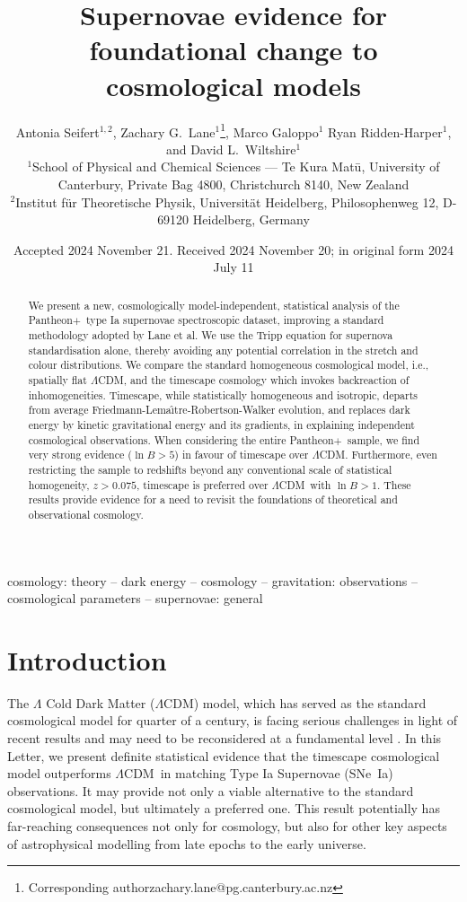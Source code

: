 \documentclass[fleqn,usenatbib]{mnras}
\title[Evidence for fundamental change in cosmology]{Supernovae evidence for foundational change to cosmological models}
\author[Seifert et al.]{\fontsize{13pt}{16pt}\selectfont Antonia Seifert$^{1,2}$\orcidlink{0009-0005-9892-3667}, Zachary G.~Lane$^{1}$\orcidlink{0009-0003-8380-4003}\thanks{Corresponding author\newline zachary.lane@pg.canterbury.ac.nz}, Marco Galoppo$^1$\orcidlink{ 0000-0003-2783-3603}\newauthor \fontsize{13pt}{16pt}\selectfont
Ryan Ridden-Harper$^{1}$\orcidlink{0000-0003-1724-2885},
and David L.~Wiltshire$^{1}$\orcidlink{0000-0003-1992-6682}
\\
$^{1}$School of Physical and Chemical Sciences — Te Kura Mat\={u}, University of Canterbury, Private Bag 4800, Christchurch 8140, New Zealand\\
$^{2}$Institut f\"ur Theoretische Physik, Universit\"at Heidelberg, Philosophenweg 12, D-69120 Heidelberg, Germany\\ 
}
\date{Accepted 2024 November 21. Received 2024 November 20; in original form 2024 July 11}
\newcommand{\pplus}{Pantheon$+$}
\newcommand{\LA}{\Lambda}
\newcommand{\LCDM}{$\LA$CDM}
\newcommand{\lcdm}{spatially flat $\LA$CDM}
\newcommand{\sne}{SNe~Ia}
\begin{document}
\label{firstpage}
\pagerange{\pageref{firstpage}--\pageref{lastpage}}
\maketitle


\begin{abstract}

We present a new, cosmologically model-independent, statistical analysis of the \pplus\ type Ia supernovae spectroscopic dataset, improving a standard methodology adopted by Lane et al. We use the Tripp equation for supernova standardisation alone, thereby avoiding any potential correlation in the stretch and colour distributions. We compare the standard homogeneous cosmological model, i.e., \lcdm, and the timescape cosmology which invokes backreaction of inhomogeneities. Timescape, while statistically homogeneous and isotropic, departs from average Friedmann-Lema\^{\i}tre-Robertson-Walker evolution, and replaces dark energy by kinetic gravitational energy and its gradients, in explaining independent cosmological observations. When considering the entire \pplus\ sample, we find very strong evidence ($\ln B> 5$) in favour of timescape over \LCDM. Furthermore, even restricting the sample to redshifts beyond any conventional scale of statistical homogeneity, $z > 0.075$, timescape  is preferred over \LCDM\ with $\ln B> 1$. These results provide evidence for a need to revisit the foundations of theoretical and observational cosmology.
\end{abstract}

\begin{keywords}
cosmology: theory -- dark energy -- cosmology -- gravitation: observations -- cosmological parameters -- supernovae: general

\end{keywords}


\section{Introduction}\label{sec:intro}

The $\Lambda$ Cold Dark Matter (\LCDM) model, which has served as %
the standard cosmological model for quarter of a century, is facing serious challenges in light of recent results \citep{DES_2024, DESI_2024} and may need to be reconsidered at a fundamental level \citep{Di_Valentino_2021, Peebles_2022, Aluri_2022}. In this Letter, we present definite statistical evidence that the timescape cosmological model \citep{Wiltshire_2007_clocks,Wiltshire_2007_sol,Wiltshire_2009_obs} outperforms \LCDM\ in matching Type Ia Supernovae (\sne) observations. It may provide not only a viable alternative to the standard cosmological model, but ultimately a preferred one. This result potentially has far-reaching consequences not only for cosmology, but also for other key aspects of astrophysical modelling from late epochs to the early universe. 
\end{document}
